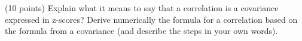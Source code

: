 \documentclass[onecolumn,10pt]{jhwhw}
\begin{document}

(10 points) Explain what it means to say that a correlation is a covariance expressed in z-scores? Derive numerically the formula for a correlation based on the formula from a covariance (and describe the steps in your own words).






\end{document}
